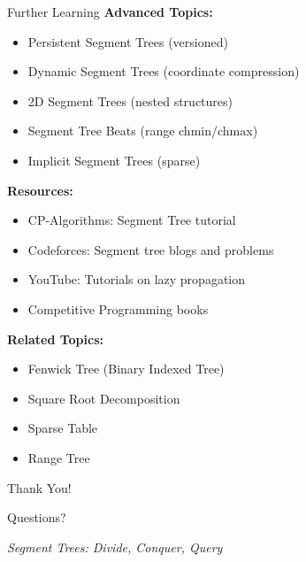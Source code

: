 \documentclass[aspectratio=169]{beamer}
\begin{document}
\begin{frame}{Further Learning}
  \textbf{Advanced Topics:}
  \begin{itemize}
    \item Persistent Segment Trees (versioned)
    \item Dynamic Segment Trees (coordinate compression)
    \item 2D Segment Trees (nested structures)
    \item Segment Tree Beats (range chmin/chmax)
    \item Implicit Segment Trees (sparse)
  \end{itemize}

  \vspace{0.5cm}
  \textbf{Resources:}
  \begin{itemize}
    \item CP-Algorithms: Segment Tree tutorial
    \item Codeforces: Segment tree blogs and problems
    \item YouTube: Tutorials on lazy propagation
    \item Competitive Programming books
  \end{itemize}

  \vspace{0.5cm}
  \textbf{Related Topics:}
  \begin{itemize}
    \item Fenwick Tree (Binary Indexed Tree)
    \item Square Root Decomposition
    \item Sparse Table
    \item Range Tree
  \end{itemize}
\end{frame}

\begin{frame}
  \begin{center}
    {\Huge Thank You!}

    \vspace{1cm}
    {\Large Questions?}

    \vspace{1cm}
    \textit{Segment Trees: Divide, Conquer, Query}
  \end{center}
\end{frame}
\end{document}

